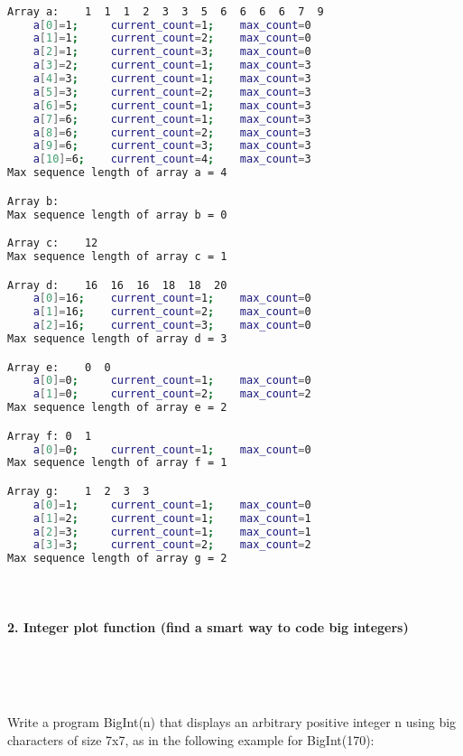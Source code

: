 \documentclass{article}
\begin{document}
	\ttfamily
	\begin{lstlisting}[language=bash]

Array a:    1  1  1  2  3  3  5  6  6  6  6  7  9
    a[0]=1; 	current_count=1; 	max_count=0
    a[1]=1; 	current_count=2; 	max_count=0
    a[2]=1; 	current_count=3; 	max_count=0
    a[3]=2; 	current_count=1; 	max_count=3
    a[4]=3; 	current_count=1; 	max_count=3
    a[5]=3; 	current_count=2; 	max_count=3
    a[6]=5; 	current_count=1; 	max_count=3
    a[7]=6; 	current_count=1; 	max_count=3
    a[8]=6; 	current_count=2; 	max_count=3
    a[9]=6; 	current_count=3; 	max_count=3
    a[10]=6; 	current_count=4; 	max_count=3
Max sequence length of array a = 4

Array b:
Max sequence length of array b = 0

Array c:    12
Max sequence length of array c = 1

Array d:    16  16  16  18  18  20
    a[0]=16; 	current_count=1; 	max_count=0
    a[1]=16; 	current_count=2; 	max_count=0
    a[2]=16; 	current_count=3; 	max_count=0
Max sequence length of array d = 3

Array e:    0  0
    a[0]=0; 	current_count=1; 	max_count=0
    a[1]=0; 	current_count=2; 	max_count=2
Max sequence length of array e = 2

Array f: 0  1
    a[0]=0; 	current_count=1; 	max_count=0
Max sequence length of array f = 1

Array g:    1  2  3  3
    a[0]=1; 	current_count=1; 	max_count=0
    a[1]=2; 	current_count=1; 	max_count=1
    a[2]=3; 	current_count=1; 	max_count=1
    a[3]=3; 	current_count=2; 	max_count=2
Max sequence length of array g = 2

	\end{lstlisting}
	
	
\paragraph{}\

	
	
	\rmfamily
	
	\paragraph{2. Integer plot function (find a smart way to code big integers) }\
	
	\rmfamily\
	
		Write a program BigInt(n) that displays an arbitrary positive integer n using big characters of size 7x7, as in the following example for BigInt(170):
				
\end{document}
